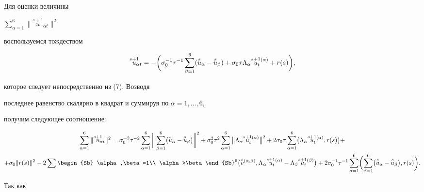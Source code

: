 Для оценки величины 


$\sum\limits_{\alpha=1}^6\|\overset{s+1}{u}_{\!\!\!\alpha t}\|^2$


воспользуемся тождеством


$$


\overset{s+1}{u}_{\!\!\!\alpha t}=-\bigg(\sigma_0^{-1}\tau^{-1}


\sum_{\beta=1}^6(\usa-\usb)+\sigma_0\tau\Lambda_\alpha


\ussat+r(s)\bigg),


$$


которое следует непосредственно из (7). Возводя


последнее равенство скалярно в квадрат и суммируя по $\alpha=1,\dotsc,6$,


получим следующее соотношение:


\begin{multline}


\sum_{\alpha=1}^6\|\overset{s+1}{u}_{\!\!\!\alpha t}\|^2=


\sigma_0^{-2}\tau^{-2}\sum_{\alpha=1}^6\bigg\|\sum_{\beta=1}^6\bigl(\usa


-\usb\bigr)\bigg\|^2+\sigma_0^2\tau^2\sum_{\alpha=1}^6\big\|\Lambda_\alpha


\ussat\big\|^2+2\sigma_0\tau\sum_{\alpha=1}^6


\bigl(\Lambda_\alpha\ussat,r(s)\bigr)+ \\


%


+\sigma_0\|r(s)\|^2-2\sum


\begin{Sb} \alpha,\beta=1\\ \alpha>\beta\end{Sb}^6


\bigl(\overset{s}{v}{}^{(\alpha,\beta)},\Lambda_\alpha


\ussat-\Lambda_\beta\ussbt\bigr)+2\sigma_0^{-1}\tau^{-1}


\sum_{\alpha=1}^6\biggl(\sum_{\beta=1}^6\bigl(\usa-\usb\bigr),r(s)\biggr).


\end{multline}


Так как 


